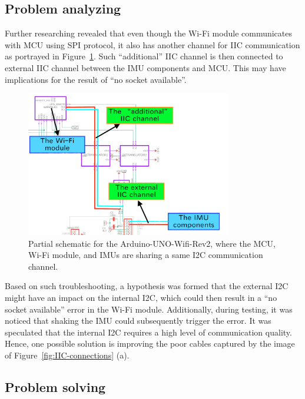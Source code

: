 \subsection{Problem analyzing}
Further researching revealed that even though the Wi-Fi module communicates with MCU using SPI protocol, it also has another channel for IIC communication as portrayed in  Figure~\ref{fig:IIC-conflict}.
Such ``additional'' IIC channel is then connected to external IIC channel between the IMU components and MCU\@.
This may have implications for the result of ``no socket available''.

\begin{figure}[htbp]
	\centering
	\includegraphics[width=0.8\textwidth]{
		fileForWriting/IIC-conflict}
	\caption[Schematic for the Arduino-UNO-Wifi-Rev2]{Partial schematic for the Arduino-UNO-Wifi-Rev2, where the MCU, Wi-Fi module, and IMUs are sharing a same I2C communication channel.
	}
	\label{fig:IIC-conflict}
\end{figure}



Based on such troubleshooting, a hypothesis was formed that the external I2C might have an impact on the internal I2C, which could then result in a ``no socket available'' error in the Wi-Fi module.
Additionally, during testing, it was noticed that shaking the IMU could subsequently trigger the error.
It was speculated that the internal I2C requires a high level of communication quality.
Hence, one possible solution is improving the poor cables captured by the image of  Figure~\ref{fig:IIC-connections} (a).


\subsection{Problem solving}
